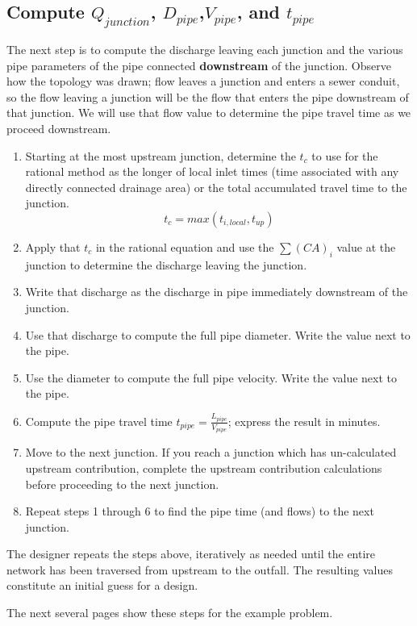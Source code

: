 \documentclass[12pt]{article}
\begin{document}
\subsection*{Compute $Q_{junction}$, $D_{pipe}$,$V_{pipe}$, and $t_{pipe}$}
The next step is to compute the discharge leaving each junction and the various pipe parameters of the pipe connected \textbf{downstream} of the junction.
Observe how the topology was drawn; flow leaves a junction and enters a sewer conduit, so the flow leaving a junction will be the flow that enters the pipe downstream of that junction. 
We will use that flow value to determine the pipe travel time as we proceed downstream.
\begin{enumerate}
\item Starting at the most upstream junction, determine the $t_c$ to use for the rational method as the longer of local inlet times (time associated with any directly connected drainage area) or the total accumulated travel time to the junction.
\begin{equation}
t_c = max( t_{i,local},t_{up})
\end{equation}
\item Apply that $t_c$ in the rational equation and use the $\sum (CA)_i$ value at the junction to determine the discharge leaving the junction.
\item Write that discharge as the discharge in pipe immediately downstream of the junction.
\item Use that discharge to compute the full pipe diameter.  Write the value next to the pipe.
\item Use the diameter to compute the full pipe velocity. Write the value next to the pipe.
\item Compute the pipe travel time $t_{pipe} = \frac{L_{pipe}}{V_{pipe}}$; express the result in minutes.
\item Move to the next junction.  If you reach a junction which has un-calculated upstream contribution, complete the upstream contribution calculations before proceeding to the next junction.
\item Repeat steps 1 through 6 to find the pipe time (and flows) to the next junction. 
\end{enumerate}

The designer repeats the steps above, iteratively as needed until the entire network has been traversed from upstream to the outfall.  
The resulting values constitute an initial guess for a design.

The next several pages show these steps for the example problem.
\end{document}
